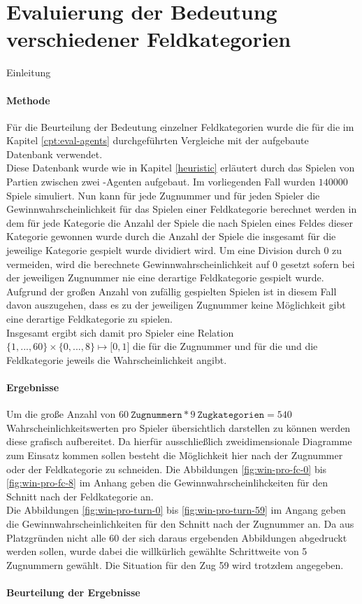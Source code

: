 \section{Evaluierung der Bedeutung verschiedener Feldkategorien}
Einleitung
\paragraph{Methode}
Für die Beurteilung der Bedeutung einzelner Feldkategorien wurde die für die im Kapitel \ref{cpt:eval-agents} durchgeführten Vergleiche mit der  aufgebaute Datenbank verwendet.
\\Diese Datenbank wurde wie in Kapitel \ref{heuristic} erläutert durch das Spielen von Partien zwischen zwei -Agenten aufgebaut. Im vorliegenden Fall wurden $140000$ Spiele simuliert. Nun kann für jede Zugnummer und für jeden Spieler die Gewinnwahrscheinlichkeit für das Spielen einer Feldkategorie berechnet werden in dem für jede Kategorie die Anzahl der Spiele die nach Spielen eines Feldes dieser Kategorie gewonnen wurde durch die Anzahl der Spiele die insgesamt für die jeweilige Kategorie gespielt wurde dividiert wird. Um eine Division durch $0$ zu vermeiden, wird die berechnete Gewinnwahrscheinlichkeit auf $0$ gesetzt sofern bei der jeweiligen Zugnummer nie eine derartige Feldkategorie gespielt wurde. Aufgrund der großen Anzahl von zufällig gespielten Spielen ist in diesem Fall davon auszugehen, dass es zu der jeweiligen Zugnummer keine Möglichkeit gibt eine derartige Feldkategorie zu spielen. 
\\Insgesamt ergibt sich damit pro Spieler eine Relation $\lbrace1, ..., 60\rbrace\times\lbrace0, ..., 8\rbrace\mapsto\lbrack0,1\rbrack$ die für die Zugnummer und für die und die Feldkategorie jeweils die Wahrscheinlichkeit angibt.
  
\paragraph{Ergebnisse}
Um die große Anzahl von $60\ \mathtt{Zugnummern} * 9\ \mathtt{Zugkategorien} = 540$ Wahrscheinlichkeitswerten pro Spieler übersichtlich darstellen zu können werden diese grafisch aufbereitet. Da hierfür ausschließlich zweidimensionale Diagramme zum Einsatz kommen sollen besteht die Möglichkeit hier nach der Zugnummer oder der Feldkategorie zu schneiden. Die Abbildungen \ref{fig:win-pro-fc-0} bis \ref{fig:win-pro-fc-8} im Anhang geben die Gewinnwahrscheinlihckeiten für den Schnitt nach der Feldkategorie an.
\\Die Abbildungen \ref{fig:win-pro-turn-0} bis \ref{fig:win-pro-turn-59} im Angang geben die Gewinnwahrscheinlichkeiten für den Schnitt nach der Zugnummer an. Da aus Platzgründen nicht alle 60 der sich daraus ergebenden Abbildungen abgedruckt werden sollen, wurde dabei die willkürlich gewählte Schrittweite von 5 Zugnummern gewählt. Die Situation für den Zug 59 wird trotzdem angegeben.
\paragraph{Beurteilung der Ergebnisse}